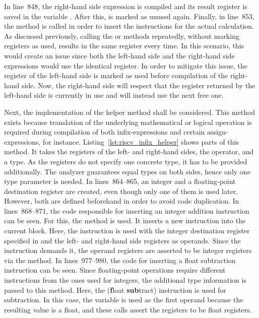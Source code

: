 In line~848, the right-hand side expression is compiled and its result register is saved in the variable .
After this,  is marked as unused again.
Finally, in line~853, the  method is called in order to insert the instructions for the actual calculation.
As discussed previously, calling the  or  methods
repeatedly, without marking registers as used, results in the same register every time.
In this scenario, this would create an issue since both the left-hand side and the right-hand side expressions would use the identical register.
In order to mitigate this issue, the register of the left-hand side is marked as used before compilation of the right-hand side.
Now, the right-hand side will respect that the register returned by the left-hand side is currently in use and will instead use the next free one.


Next, the implementation of the  helper method shall be considered.
This method exists because translation of the underlying mathematical or logical operation
is required during compilation of both infix-expressions and certain assign-expressions, \mbox{} for instance.
Listing~\ref{lst:riscv_infix_helper} shows parts of this method.
It takes the registers of the left- and right-hand sides, the operator, and a type.
As the registers do not specify one concrete type, it has to be provided additionally.
The analyzer guarantees equal types on both sides, hence only one type parameter is needed.
In lines~864--865, an integer and a floating-point destination register are created, even though only one of them is used later.
However, both are defined beforehand in order to avoid code duplication.
In lines~868--871, the code responsible for inserting an integer addition instruction can be seen.
For this, the  method is used.
It inserts a new instruction into the current block.
Here, the  instruction is used with the integer destination register specified in  and the left- and right-hand side registers as operands.
Since the  instruction demands it, the operand registers are asserted to be integer registers via the  method.
In lines~977--980, the code for inserting a float subtraction instruction can be seen.
Since floating-point operations require different instructions from the ones used for integers, the additional type information is passed to this method.
Here, the  (\textbf{f}loat \textbf{sub}tract) instruction is used for subtraction.
In this case, the variable  is used as the first operand because the resulting value is a float,
and these  calls assert the registers to be float registers.

